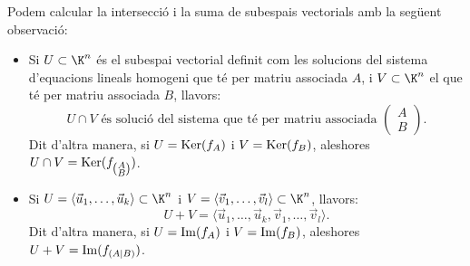 \begin{observacio}
    Podem calcular la intersecció i la suma de subespais vectorials amb la següent observació:
    \begin{itemize}
        \item Si $U\subset \K^n$ és el subespai vectorial definit com les solucions del sistema d'equacions lineals homogeni que té per matriu associada $A$, i $V\subset \K^n$ el que té per matriu associada $B$, llavors: 
        $$
        U \cap V \text{ és solució del sistema que té per matriu associada } \begin{pmatrix}
        A \\ B
        \end{pmatrix}.
        $$
        Dit d'altra manera, si $U = \operatorname{Ker}(f_A)$ i $V=\operatorname{Ker}(f_B)$, aleshores $U\cap V = \operatorname{Ker}(f_{\left(\substack{A\\B}\right)})$.
        \item Si $U=\langle \vec u_1, \dots, \vec u_k \rangle \subset \K^n$ i $V=\langle \vec v_1, \dots, \vec v_l \rangle \subset \K^n$, llavors:
        $$
        U+V=\langle \vec u_1, \dots, \vec u_k, \vec v_1, \dots, \vec v_l \rangle .
        $$
        Dit d'altra manera, si $U = \operatorname{Im}(f_A)$ i $V=\operatorname{Im}(f_B)$, aleshores $U+V = \operatorname{Im}(f_{(A|B)})$.
    \end{itemize}
\end{observacio}
